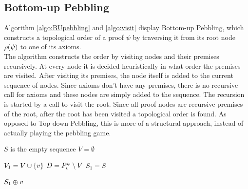 \documentclass{llncs}
\begin{document}
\subsection{Bottom-up Pebbling}

Algorithm \ref{algo:BUpebbling} and \ref{algo:visit} display Bottom-up Pebbling, which constructs a topological order of a proof $\psi$ by traversing it from its root node $\rho(\psi)$ to one of its axioms.\\
The algorithm constructs the order by visiting nodes and their premises recursively. 
At every node it is decided heuristically in what order the premises are visited.
After visiting its premises, the node itself is added to the current sequence of nodes.
Since axioms don't have any premises, there is no recursive call for axioms and these nodes are simply added to the sequence.
The recursion is started by a call to visit the root.
Since all proof nodes are recursive premises of the root, after the root has been visited a topological order is found.
As opposed to Top-down Pebbling, this is more of a structural approach, instead of actually playing the pebbling game.


\begin{algorithm}[h]
  \BlankLine

	$S$ is the empty sequence\;
	$V = \emptyset$\;
	\Return {}\;

  \caption[.]{}
  \label{algo:BUpebbling}
\end{algorithm}

\begin{algorithm}[h]
	
	$V_1 = V \cup \{v\}$\;
	$D = P_{v}^{\psi} \setminus V$\;
	$S_1 = S$
	
	
	\Return $S_1 \oplus v$\;
	
  \caption[.]{}
  \label{algo:visit}
\end{algorithm}
\end{document}
